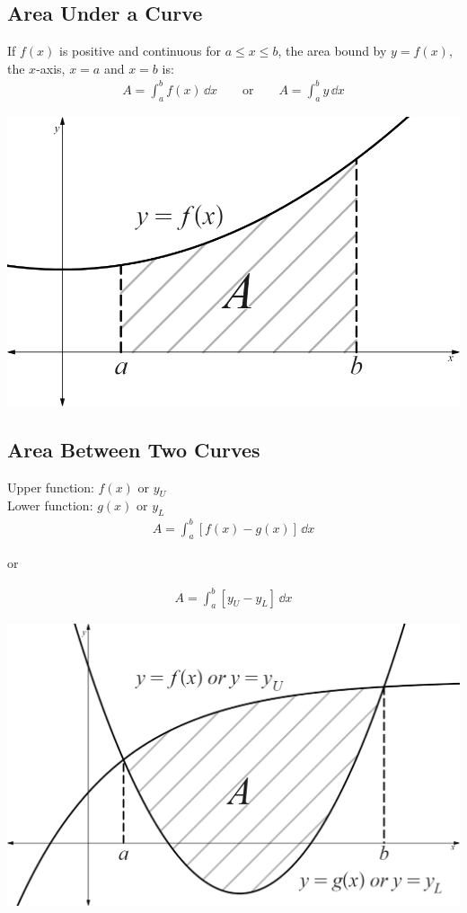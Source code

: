 \documentclass[10pt, a4paper, titlepage]{article}
\begin{document}
\begin{multicols*}{3}
	\subsection{Area Under a Curve}
	If $f(x)$ is positive and continuous for $a\leq x\leq b$, the area bound by $y=f(x)$, the $x$-axis, $x=a$ and $x=b$ is:
	\begin{align}
		A=\int_{a}^{b}f(x)\,\dd{x}\qquad \text{or}\qquad A=\int_{a}^{b}y\,\dd{x}
	\end{align}
	\begin{center}
		\includegraphics[width=0.9\linewidth]{area_under_a_curve.png}\\
	\end{center}

	\dotfill
	\subsection{Area Between Two Curves}
	Upper function: $f(x)$ or $y_U$\\
	Lower function: $g(x)$ or $y_L$
	\begin{align}
		A=\int_{a}^{b}\left[f(x)-g(x)\right]\,\dd{x}
	\end{align}
	\begin{center}
		or
	\end{center}
	\begin{align}
		A=\int_{a}^{b}\left[y_U-y_L\right]\,\dd{x}
	\end{align}
	\begin{center}
		\includegraphics[width=0.9\linewidth]{area_between_two_curves.png}\\
	\end{center}


\end{multicols*}
\end{document}
